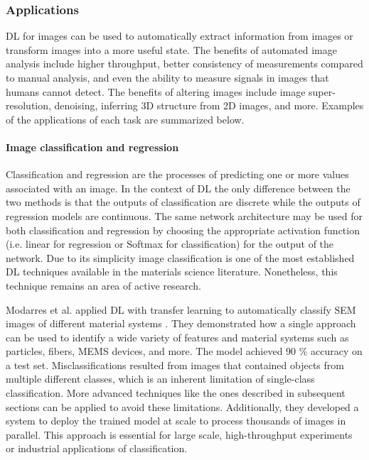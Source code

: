 \documentclass[pdflatex,sn-mathphys]{sn-jnl}%
\theoremstyle{thmstyleone}%
\theoremstyle{thmstyletwo}%
\theoremstyle{thmstylethree}%
\begin{document}
\subsubsection{Applications}
DL for images can be used to automatically extract information from images or transform images into a more useful state. The benefits of automated image analysis include higher throughput, better consistency of measurements compared to manual analysis, and even the ability to measure signals in images that humans cannot detect. The benefits of altering images include image super-resolution, denoising, inferring 3D structure from 2D images, and more. Examples of the applications of each task are summarized below.

\paragraph{Image classification and regression}
Classification and regression are the processes of predicting one or more values associated with an image. In the context of DL the only difference between the two methods is that the outputs of classification are discrete while the outputs of regression models are continuous. The same network architecture may be used for both classification and regression by choosing the appropriate activation function (i.e. linear for regression or Softmax for classification) for the output of the network. Due to its simplicity image classification is one of the most established DL techniques available in the materials science literature. Nonetheless, this technique remains an area of active research.

Modarres et al. applied DL with transfer learning to automatically classify SEM images of different material systems \cite{modarres2017neural}.  They demonstrated how a single approach can be used to identify a wide variety of features and material systems such as particles, fibers, MEMS devices, and more. The model achieved 90 \% accuracy on a test set. Misclassifications resulted from images that contained objects from multiple different classes, which is an inherent limitation of single-class classification. More advanced techniques like the ones described in subsequent sections can be applied to avoid these limitations.   Additionally, they developed a system to deploy the trained model at scale to process thousands of images in parallel. This approach is essential for large scale, high-throughput experiments or industrial applications of classification.
\end{document}
